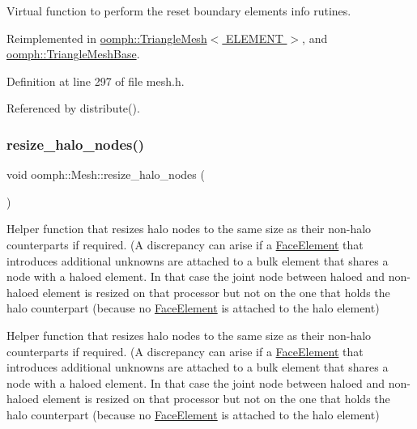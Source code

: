 Virtual function to perform the reset boundary elements info rutines. 



Reimplemented in \hyperlink{classoomph_1_1TriangleMesh_a2ae8220e71309b0fb2b53194c6383f95}{oomph\+::\+Triangle\+Mesh$<$ E\+L\+E\+M\+E\+N\+T $>$}, and \hyperlink{classoomph_1_1TriangleMeshBase_a87ca1b2f78d61547def3245a5201689e}{oomph\+::\+Triangle\+Mesh\+Base}.



Definition at line 297 of file mesh.\+h.



Referenced by distribute().

\mbox{\label{classoomph_1_1Mesh_ad1e7104f5ffadce2823c4088327fd402}} 
\subsubsection{\texorpdfstring{resize\+\_\+halo\+\_\+nodes()}{resize\_halo\_nodes()}}
{\footnotesize\ttfamily void oomph\+::\+Mesh\+::resize\+\_\+halo\+\_\+nodes (\begin{DoxyParamCaption}{ }\end{DoxyParamCaption})}



Helper function that resizes halo nodes to the same size as their non-\/halo counterparts if required. (A discrepancy can arise if a \hyperlink{classoomph_1_1FaceElement}{Face\+Element} that introduces additional unknowns are attached to a bulk element that shares a node with a haloed element. In that case the joint node between haloed and non-\/haloed element is resized on that processor but not on the one that holds the halo counterpart (because no \hyperlink{classoomph_1_1FaceElement}{Face\+Element} is attached to the halo element) 

Helper function that resizes halo nodes to the same size as their non-\/halo counterparts if required. (A discrepancy can arise if a \hyperlink{classoomph_1_1FaceElement}{Face\+Element} that introduces additional unknowns are attached to a bulk element that shares a node with a haloed element. In that case the joint node between haloed and non-\/haloed element is resized on that processor but not on the one that holds the halo counterpart (because no \hyperlink{classoomph_1_1FaceElement}{Face\+Element} is attached to the halo element) 

